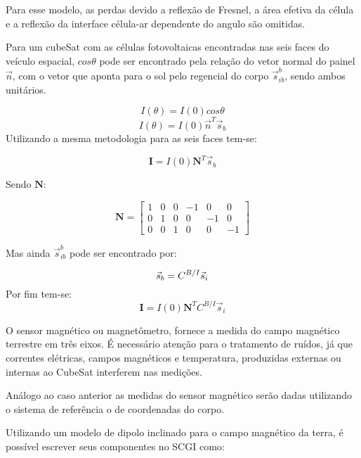 Para esse modelo, as perdas devido a reflexão de Fresnel, a área efetiva da célula e a reflexão da interface célula-ar dependente do angulo são omitidas.

Para um cubeSat com as células fotovoltaicas encontradas nas seis faces do veículo espacial,  $cos\theta$ pode ser encontrado pela relação do vetor normal do painel $\vec{n}$, com o vetor que aponta para o sol pelo regencial do corpo $\vec{s}^b_{ib}$, sendo ambos unitários.

\begin{equation}
I(\theta)=I(0)cos\theta
\end{equation}
\begin{equation}
I(\theta)=I(0)\vec{n}^T \vec{s}_b
\end{equation}
Utilizando a mesma metodologia para as seis faces tem-se:

\begin{equation}
\mathbf{I}=I(0)\mathbf{N}^T\vec{s}_b
\end{equation}

Sendo $\mathbf{N}$:

\begin{equation}
\mathbf{N}=
\begin{bmatrix}
	1 & 0 & 0 & -1 & 0 & 0\\ 
	0 & 1 & 0 & 0 & -1 & 0\\ 
	0 & 0 & 1 & 0 & 0 & -1
\end{bmatrix}
\end{equation}

Mas ainda $\vec{s}^b_{ib}$ pode ser encontrado por:

\begin{equation}
\vec{s}_b=C^{B/I}\vec{s}_i\\
\end{equation}
Por fim tem-se:
\begin{equation}
\mathbf{I}=I(0)\mathbf{N}^T C^{B/I}\vec{s}_i
\end{equation}

O sensor magnético ou magnetômetro, fornece a medida do campo magnético terrestre em três eixos. É necessário atenção para o tratamento de ruídos, já que correntes elétricas, campos magnéticos e temperatura, produzidas externas ou internas ao CubeSat interferem nas medições.

Análogo ao caso anterior as medidas do sensor magnético serão dadas utilizando o sistema de referência o de coordenadas do corpo. 

Utilizando um modelo de dipolo inclinado para o campo magnético da terra, é possível escrever seus componentes no SCGI como:

